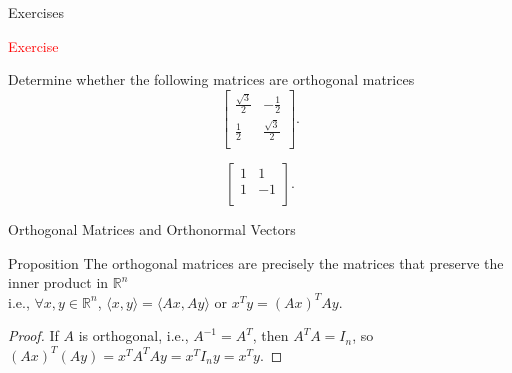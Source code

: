 \documentclass[aspectratio=169]{beamer}
\begin{document}
    \begin{frame}{Exercises}

        \par \textcolor{red}{Exercise}
        \par Determine whether the following matrices are orthogonal matrices 
        \begin{equation*}
            \left[ \begin{array}{cc} 
               \frac{\sqrt{3}}{2}& -\frac{1}{2} \\ 
                \frac{1}{2} &  \frac{\sqrt{3}}{2} \\ 
            \end{array} \right].
        \end{equation*}

        \begin{equation*}
            \left[ \begin{array}{cc} 
                1 & 1 \\ 
                1 & -1\\ 
            \end{array} \right]. 
        \end{equation*}
    \end{frame}
\begin{frame}{Orthogonal Matrices and Orthonormal Vectors}
    \begin{block}{Proposition}
The orthogonal matrices are precisely the matrices that preserve the inner product in $\mathbb{R}^n$ \\
i.e., $\forall x,y \in \mathbb{R}^n$, $\langle x,y \rangle = \langle Ax, Ay \rangle$
or $x^T y = (Ax)^T Ay$.
\end{block}

\begin{proof}
If $A$ is orthogonal, i.e., $A^{-1} = A^T$,
then $A^T A = I_n$, so $(Ax)^T (Ay) = x^T A^T A y = x^T I_n y = x^T y$.
\end{proof}
\end{frame}
\end{document}
